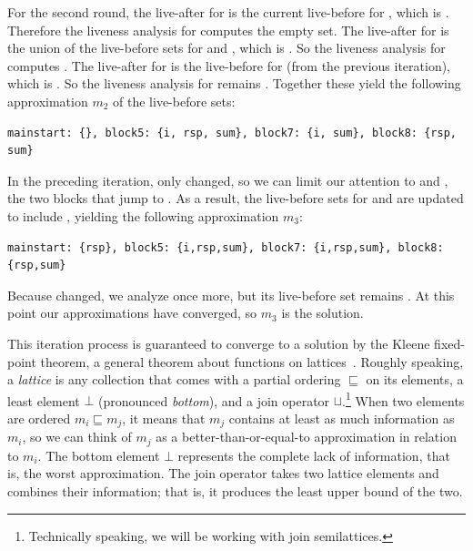 \documentclass[7x10]{TimesAPriori_MIT}%
\numberwithin{theorem}{chapter}
\numberwithin{definition}{chapter}
\numberwithin{equation}{chapter}
\begin{document}
For the second round, the live-after for  is the
current live-before for , which is .  Therefore
the liveness analysis for  computes the empty set. The
live-after for  is the union of the live-before sets for
 and , which is .
So the liveness analysis for  computes .  The live-after for  is the live-before for
 (from the previous iteration), which is .
So the liveness analysis for  remains .
Together these yield the following approximation $m_2$ of
the live-before sets:
\begin{center}
  \begin{lstlisting}
mainstart: {}, block5: {i, rsp, sum}, block7: {i, sum}, block8: {rsp, sum}
\end{lstlisting}
\end{center}
In the preceding iteration, only  changed, so we can
limit our attention to  and , the two
blocks that jump to .  As a result, the live-before sets
for  and  are updated to include
, yielding the following approximation $m_3$:
\begin{center}
  \begin{lstlisting}
mainstart: {rsp}, block5: {i,rsp,sum}, block7: {i,rsp,sum}, block8: {rsp,sum}
\end{lstlisting}
\end{center}
Because  changed, we analyze  once more, but
its live-before set remains .  At this point
our approximations have converged, so $m_3$ is the solution.

This iteration process is guaranteed to converge to a solution by the
Kleene fixed-point theorem, a general theorem about functions on
lattices~\citep{Kleene:1952aa}. Roughly speaking, a \emph{lattice} is
any collection that comes with a partial ordering $\sqsubseteq$ on its
elements, a least element $\bot$ (pronounced \emph{bottom}), and a
join operator
$\sqcup$.\footnote{Technically speaking, we
  will be working with join semilattices.} When two elements are
ordered $m_i \sqsubseteq m_j$, it means that $m_j$ contains at least
as much information as $m_i$, so we can think of $m_j$ as a
better-than-or-equal-to approximation in relation to $m_i$.  The
bottom element $\bot$ represents the complete lack of information,
that is, the worst approximation.  The join operator takes two lattice
elements and combines their information; that is, it produces the
least upper bound of the two.
\end{document}
